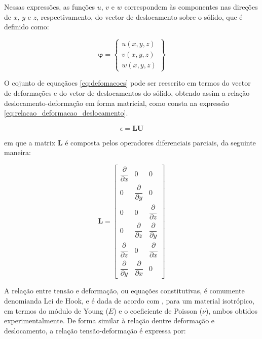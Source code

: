 Nessas expressões, as funções $u$, $v$ e $w$ correspondem às componentes nas direções de $x$, $y$ e $z$, respectivamento, do vector de deslocamento sobre o sólido, que é definido como:

\begin{equation} \label{eq:funcao_deslocamento}
    \mathbf{\varphi} = \begin{Bmatrix}
        u(x,y,z) \\
        v(x,y,z) \\
        w(x,y,z)
    \end{Bmatrix}
\end{equation}


O cojunto de equaçãoes \ref{eq:defomacoes} pode ser reescrito em termos do vector de deformações e do vetor de deslocamentos do sólido, obtendo assim a relação deslocamento-deformação em forma matricial, como consta na expressão \ref{eq:relacao_deformacao_deslocamento}.

\begin{equation} \label{eq:relacao_deformacao_deslocamento}
    \epsilon = \mathbf{L} \mathbf{U}
\end{equation}

em que a matrix $\mathbf{L}$ é composta pelos operadores diferenciais parciais, da seguinte maneira:

\begin{equation}
    \mathbf{L} = \begin{bmatrix}
        \dfrac{\partial}{\partial x} & 0 & 0 \\
        0 & \dfrac{\partial}{\partial y} & 0 \\
        0 & 0 & \dfrac{\partial}{\partial z} \\
        0 & \dfrac{\partial}{\partial z} & \dfrac{\partial}{\partial y} \\
        \dfrac{\partial}{\partial z} & 0 & \dfrac{\partial}{\partial x} \\
        \dfrac{\partial}{\partial y} & \dfrac{\partial}{\partial x} & 0
    \end{bmatrix}
\end{equation}

A relação entre tensão e deformação, ou equações constitutivas, é comumente denomianda Lei de Hook, e é dada de acordo com , para um material isotrópico, em termos do módulo de Young ($E$) e o coeficiente de Poisson ($\nu$), ambos obtidos experimentalmente. De forma similar à relação dentre deformação e deslocamento, a relação tensão-deformação é expressa por:

